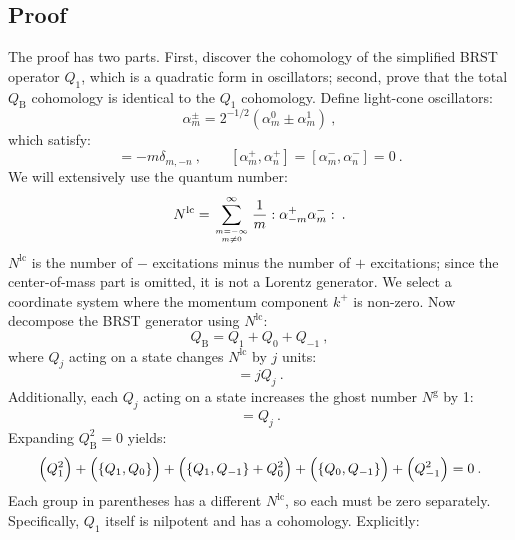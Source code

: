\subsection*{Proof}
The proof has two parts. First, discover the cohomology of the simplified BRST operator $Q_{1}$, which is a quadratic form in oscillators; second, prove that the total $Q_{\mathrm{B}}$ cohomology is identical to the $Q_{1}$ cohomology. Define light-cone oscillators:
\begin{equation}
\alpha_{m}^{\pm}=2^{-1 / 2} (\alpha_{m}^{0} \pm \alpha_{m}^{1}) \:, \label{4.4.6}
\end{equation}
which satisfy:
\begin{equation}
[\alpha_{m}^{+}, \alpha_{n}^{-}]=-m \delta_{m,-n} \:, \qquad [\alpha_{m}^{+}, \alpha_{n}^{+}]=[\alpha_{m}^{-}, \alpha_{n}^{-}]=0 \:. \label{4.4.7}
\end{equation}
We will extensively use the quantum number:
\begin{equation}
N^{\mathrm{lc}}=\sum_{m=-\infty \atop m \neq 0}^{\infty} \frac{1}{m} \mathrel{ :  \alpha_{-m}^{+} \alpha_{m}^{-}  : } \:. \label{4.4.8}
\end{equation}
$N^{\mathrm{lc}}$ is the number of $-$ excitations minus the number of $+$ excitations; since the center-of-mass part is omitted, it is not a Lorentz generator. We select a coordinate system where the momentum component $k^{+}$ is non-zero. Now decompose the BRST generator using $N^{\mathrm{lc}}$:
\begin{equation}
Q_{\mathrm{B}}=Q_{1}+Q_{0}+Q_{-1} \:, \label{4.4.9}
\end{equation}
where $Q_{j}$ acting on a state changes $N^{\mathrm{lc}}$ by $j$ units:
\begin{equation}
[N^{\mathrm{lc}}, Q_{j}]=j Q_{j} \:. \label{4.4.10}
\end{equation}
Additionally, each $Q_{j}$ acting on a state increases the ghost number $N^{\mathrm{g}}$ by 1:
\begin{equation}
[N^{\mathrm{g}}, Q_{j}]=Q_{j} \:. \label{4.4.11}
\end{equation}
Expanding $Q_{\mathrm{B}}^{2}=0$ yields:
\begin{equation}
\Bigl(Q_{1}^{2}\Bigr)+ \Bigl(\{Q_{1}, Q_{0}\}\Bigr)+\Bigl(\{Q_{1}, Q_{-1}\}+Q_{0}^{2}\Bigr)+\Bigl(\{Q_{0}, Q_{-1}\}\Bigr)+\Bigl(Q_{-1}^{2}\Bigr)=0 \:. 
\label{4.4.12}
\end{equation}
Each group in parentheses has a different $N^{\mathrm{lc}}$, so each must be zero separately. Specifically, $Q_{1}$ itself is nilpotent and has a cohomology. Explicitly:
